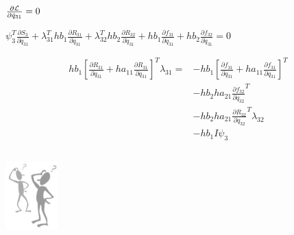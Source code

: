 \documentclass{beamer}
\newcommand{\pd}[2]{\frac{\partial #1}{\partial #2}}
\begin{document}
\begin{frame}[allowframebreaks]
  \framebreak

  \begin{block}{}\centering
    $\pd{{\cal L}}{\dot{q}_{31}}=0$
  \end{block}

  \begin{block}{}\centering
    $ 
      \psi_3^T \pd{S_3}{\dot{q}_{31}} 
      + \lambda_{31}^T hb_1\pd{R_{31}}{\dot{q}_{31}} 
      + \lambda_{32}^T hb_2\pd{R_{32}}{\dot{q}_{31}} 
      + hb_1\pd{f_{31}}{\dot{q}_{31}} 
      + hb_2\pd{f_{32}}{\dot{q}_{31}} = 0 
      $
  \end{block}

  \begin{block}{}\centering
\scriptsize{
    \begin{equation}\nonumber
      \begin{split}
        hb_1 \left[ \pd{R_{31}}{\dot{q}_{31}} + ha_{11}  \pd{R_{31}}{{q}_{31}} \right]^T\lambda_{31}  = &
        - hb_1 \left[ \pd{f_{31}}{\dot{q}_{31}} + ha_{11}  \pd{f_{31}}{{q}_{31}} \right]^T \\
        &- hb_2 ha_{21}  \pd{f_{32}}{{q}_{32}}^T \\
        &- hb_2 ha_{21}  \pd{R_{32}}{{q}_{32}}^T \lambda_{32}\\
        &- hb_1I \psi_3 
      \end{split}
    \end{equation}
}
  \end{block}
    
\end{frame}

\begin{frame}
\begin{columns}
\column{6cm}
\begin{block}{}
\centerline{ 
\includegraphics[width=0.5\textwidth]{Question.png} 
}
\end{block}
\end{columns}
\end{frame}
\end{document}
